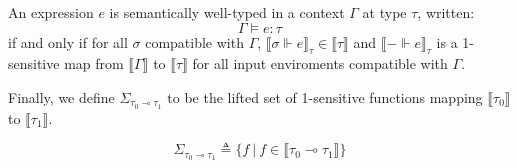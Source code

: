 \begin{definition}
  An expression $e$ is semantically well-typed in a context $\Gamma$ at type
  $\tau$, written:
  $$\Gamma \vDash e : \tau$$
  if and only if for all $\sigma$ compatible with $\Gamma$, $\llbracket
  \sigma \Vdash e \rrbracket_{\tau} \in \llbracket \tau \rrbracket$ and
  $\llbracket - \Vdash e \rrbracket_{\tau}$ is a 1-sensitive map from
  $\llbracket \Gamma \rrbracket$ to $\llbracket \tau \rrbracket$ for all input
  enviroments compatible with $\Gamma$.
\end{definition}

Finally, we define $\Sigma_{\tau_0 \multimap \tau_1}$ to be the lifted set of
1-sensitive functions mapping $\llbracket \tau_0 \rrbracket$ to $\llbracket
\tau_1 \rrbracket$.

\begin{definition}
  \begin{equation}
    \Sigma_{\tau_0 \multimap \tau_1} \triangleq \{ f \ | \ f \in \llbracket \tau_0
    \multimap \tau_1 \rrbracket \}
  \end{equation}
\end{definition}
